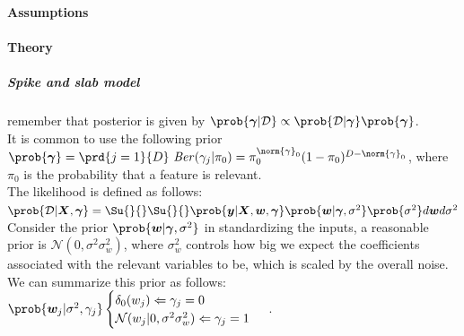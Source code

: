 \paragraph{Assumptions}
\paragraph{Theory}
\subparagraph{Spike and slab model}
remember that posterior is given by $\prob{\bm{\gamma}|\mathcal{D}}\propto \prob{
\mathcal{D}|\bm{\gamma}}\prob{\bm{\gamma}}$.\\
It is common to use the following prior $\prob{\bm{\gamma}} = \prd{j=1}{D}\text{
\emph{Ber}}(\gamma_{j}|\pi_{0}) = \pi_{0}^{\norm{\gamma}_{0}}(1-\pi_{0})^{D-\norm{
\gamma}_{0}}$, where $\pi_{0}$ is the probability that a feature is relevant.\\
The likelihood is defined as follows: $\prob{\mathcal{D}|\bm{X},\bm{\gamma}} = 
\Su{}{}\Su{}{}\prob{\bm{y}|\bm{X},\bm{w},\bm{\gamma}}\prob{\bm{w}|\bm{\gamma},
\sigma^{2}}\prob{\sigma^{2}}d\bm{w}d\sigma^{2}$\\
Consider the prior $\prob{\bm{w}|\bm{\gamma},\sigma^{2}}$ in standardizing the inputs, 
a reasonable prior is $\mathcal{N}(0, \sigma^{2}\sigma_{w}^{2})$, where 
$\sigma_{w}^{2}$ controls how big we expect the coefficients associated with the 
relevant variables to be, which is scaled by the overall noise. We can summarize this 
prior as follows: $\prob{\bm{w}_{j}|\sigma^{2},\gamma_{j}}
\begin{cases}
    \delta_{0}(w_{j}) \Leftarrow \gamma_{j} = 0\\
    \mathcal{N}(w_{j}|0, \sigma^{2}\sigma_{w}^{2}) \Leftarrow \gamma_{j} = 1
\end{cases}$
.

